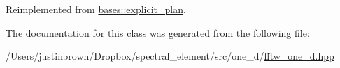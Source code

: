  

Reimplemented from \hyperlink{classbases_1_1explicit__plan_a21bcba4d429590031bba41ee2a48a4ef}{bases\-::explicit\-\_\-plan}.



The documentation for this class was generated from the following file\-:\begin{DoxyCompactItemize}
\item 
/\-Users/justinbrown/\-Dropbox/spectral\-\_\-element/src/one\-\_\-d/\hyperlink{fftw__one__d_8hpp}{fftw\-\_\-one\-\_\-d.\-hpp}\end{DoxyCompactItemize}

